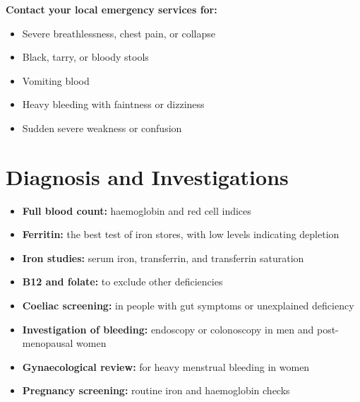 \textbf{Contact your local emergency services for:}
\begin{itemize}
    \item Severe breathlessness, chest pain, or collapse
    \item Black, tarry, or bloody stools
    \item Vomiting blood
    \item Heavy bleeding with faintness or dizziness
    \item Sudden severe weakness or confusion
\end{itemize}

\section*{Diagnosis and Investigations}
\begin{itemize}
    \item \textbf{Full blood count:} haemoglobin and red cell indices
    \item \textbf{Ferritin:} the best test of iron stores, with low levels indicating depletion
    \item \textbf{Iron studies:} serum iron, transferrin, and transferrin saturation
    \item \textbf{B12 and folate:} to exclude other deficiencies
    \item \textbf{Coeliac screening:} in people with gut symptoms or unexplained deficiency
    \item \textbf{Investigation of bleeding:} endoscopy or colonoscopy in men and post-menopausal women
    \item \textbf{Gynaecological review:} for heavy menstrual bleeding in women
    \item \textbf{Pregnancy screening:} routine iron and haemoglobin checks
\end{itemize}

